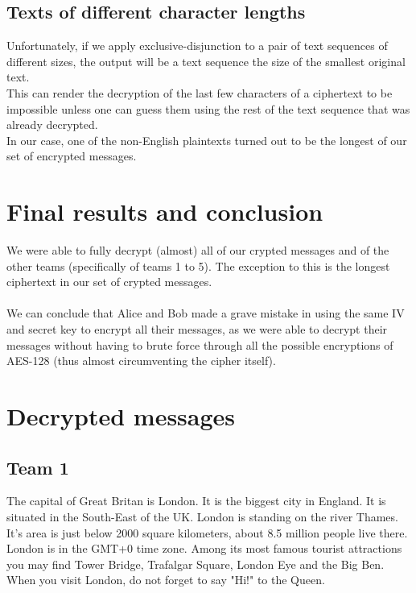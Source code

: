 \documentclass[a4paper,11pt]{article}
\begin{document}
\subsection{Texts of different character lengths}
Unfortunately, if we apply exclusive-disjunction to a pair of text sequences of different sizes, the output will be a text sequence the size of the smallest original text. \\
This can render the decryption of the last few characters of a ciphertext to be impossible unless one can guess them using the rest of the text sequence that was already decrypted. \\
In our case, one of the non-English plaintexts turned out to be the longest of our set of encrypted messages. \\

\newpage

\section{Final results and conclusion}
We were able to fully decrypt (almost) all of our crypted messages and of the other teams (specifically of teams 1 to 5). The exception to this is the longest ciphertext in our set of crypted messages. \\
\\
We can conclude that Alice and Bob made a grave mistake in using the same IV and secret key to encrypt all their messages, as we were able to decrypt their messages without having to brute force through all the possible encryptions of AES-128 (thus almost circumventing the cipher itself). \\

\newpage
\appendix

\section{Decrypted messages}

\subsection{Team 1}

\begin{displayquote}
The capital of Great Britan is London. It is the biggest city in England.
It is situated in the South-East of the UK. London is standing on the river Thames.
It's area is just below 2000 square kilometers, about 8.5 million people live there.
London is in the GMT+0 time zone.
Among its most famous tourist attractions you may find Tower Bridge,
Trafalgar Square, London Eye and the Big Ben.
When you visit London, do not forget to say "Hi!" to the Queen.
\end{displayquote}
\end{document}
